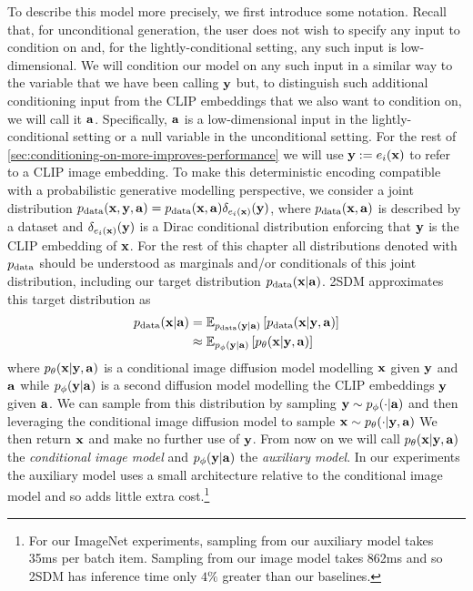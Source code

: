 To describe this model more precisely, we first introduce some notation. Recall that, for unconditional generation, the user does not wish to specify any input to condition on and, for the lightly-conditional setting, any such input is low-dimensional. We will condition our model on any such input in a similar way to the variable that we have been calling ${\mathbf{y}}$ but, to distinguish such additional conditioning input from the CLIP embeddings that we also want to condition on, we will call it ${\mathbf{a}}$. Specifically, ${\mathbf{a}}$ is a low-dimensional input in the lightly-conditional setting or a null variable in the unconditional setting. For the rest of \cref{sec:conditioning-on-more-improves-performance} we will use ${\mathbf{y}} := e_i({\mathbf{x}})$ to refer to a CLIP image embedding. To make this deterministic encoding compatible with a probabilistic generative modelling perspective, we consider a joint distribution $p_{\rm{data}}({\mathbf{x}}, {\mathbf{y}}, {\mathbf{a}})=p_{\rm{data}}({\mathbf{x}}, {\mathbf{a}})\delta_{e_i({\mathbf{x}})}({\mathbf{y}})$, where $p_{\rm{data}}({\mathbf{x}}, {\mathbf{a}})$ is described by a dataset and $\delta_{e_i({\mathbf{x}})}({\mathbf{y}})$ is a Dirac conditional distribution enforcing that ${\mathbf{y}}$ is the CLIP embedding of ${\mathbf{x}}$. For the rest of this chapter all distributions denoted with $p_{\rm{data}}$ should be understood as marginals and/or conditionals of this joint distribution, including our target distribution $p_{\rm{data}}({\mathbf{x}}|{\mathbf{a}})$. 2SDM approximates this target distribution as
%
\begin{align} \label{eq:no-a}
    \pdata(\rvx|\rva) &= \mathbb{E}_{\pdata(\rvy|\rva)} \left[ \pdata(\rvx|\rvy,\rva) \right] \\
    &\approx \mathbb{E}_{p_\phi(\rvy|\rva)} \left[ p_\theta(\rvx|\rvy,\rva) \right] %
\end{align}
where $p_\theta({\mathbf{x}}|{\mathbf{y}},{\mathbf{a}})$ is a conditional image diffusion model modelling ${\mathbf{x}}$ given ${\mathbf{y}}$ and ${\mathbf{a}}$ while $p_\phi({\mathbf{y}}|{\mathbf{a}})$ is a second diffusion model modelling the CLIP embeddings ${\mathbf{y}}$ given ${\mathbf{a}}$. We can sample from this distribution by sampling ${\mathbf{y}}\sim p_\phi(\cdot|{\mathbf{a}})$ and then leveraging the conditional image diffusion model to sample ${\mathbf{x}} \sim p_\theta(\cdot|{\mathbf{y}},{\mathbf{a}})$ We then return ${\mathbf{x}}$ and make no further use of ${\mathbf{y}}$.
%
From now on we will call $p_\theta({\mathbf{x}}|{\mathbf{y}},{\mathbf{a}})$ the \textit{conditional image model} and $p_\phi({\mathbf{y}}|{\mathbf{a}})$ the \textit{auxiliary model}. In our experiments the auxiliary model uses a small architecture relative to the conditional image model and so adds little extra cost.\footnote{For our ImageNet experiments, sampling from our auxiliary model takes 35ms per batch item. Sampling from our image model takes 862ms and so 2SDM has inference time only $4\%$ greater than our baselines.}


